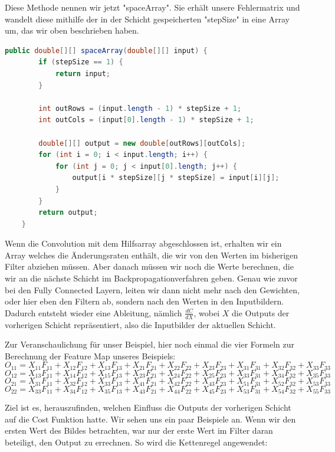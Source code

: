 \documentclass[12pt]{article}
\begin{document}
Diese Methode nennen wir jetzt "spaceArray". Sie erhält unsere Fehlermatrix und wandelt diese mithilfe der in der Schicht gespeicherten "stepSize" in eine Array um, das wir oben beschrieben haben.

\begin{lstlisting}[language=Java]
    public double[][] spaceArray(double[][] input) {
        if (stepSize == 1) {
            return input;
        }

        int outRows = (input.length - 1) * stepSize + 1;
        int outCols = (input[0].length - 1) * stepSize + 1;

        double[][] output = new double[outRows][outCols];
        for (int i = 0; i < input.length; i++) {
            for (int j = 0; j < input[0].length; j++) {
                output[i * stepSize][j * stepSize] = input[i][j];
            }
        }
        return output;
    }
\end{lstlisting}

Wenn die Convolution mit dem Hilfsarray abgeschlossen ist, erhalten wir ein Array welches die Änderungsraten enthält, die wir von den Werten im bisherigen Filter abziehen müssen.
Aber danach müssen wir noch die Werte berechnen, die wir an die nächste Schicht im Backpropagationverfahren geben. Genau wie zuvor bei den Fully Connected Layern, leiten wir dann nicht mehr nach den Gewichten, oder hier eben den Filtern ab, sondern nach den Werten in den Inputbildern. Dadurch entsteht wieder eine Ableitung, nämlich $\frac {dC} {dX}$, wobei $X$ die Outputs der vorherigen Schicht repräsentiert, also die Inputbilder der aktuellen Schicht.

Zur Veranschaulichung für unser Beispiel, hier noch einmal die vier Formeln zur Berechnung der Feature Map unseres Beispiels:
$$O_{11} = X_{11}F_{11}+X_{12}F_{12}+X_{13}F_{13}+X_{21}F_{21}+X_{22}F_{22}+X_{23}F_{23}+X_{31}F_{31}+X_{32}F_{32}+X_{33}F_{33}$$
$$O_{12} = X_{13}F_{11}+X_{14}F_{12}+X_{15}F_{13}+X_{23}F_{21}+X_{24}F_{22}+X_{25}F_{23}+X_{33}F_{31}+X_{34}F_{32}+X_{35}F_{33}$$
$$O_{21} = X_{31}F_{11}+X_{32}F_{12}+X_{33}F_{13}+X_{41}F_{21}+X_{42}F_{22}+X_{43}F_{23}+X_{51}F_{31}+X_{52}F_{32}+X_{53}F_{33}$$
$$O_{22} = X_{33}F_{11}+X_{34}F_{12}+X_{35}F_{13}+X_{43}F_{21}+X_{44}F_{22}+X_{45}F_{23}+X_{53}F_{31}+X_{54}F_{32}+X_{55}F_{33}$$

Ziel ist es, herauszufinden, welchen Einfluss die Outputs der vorherigen Schicht auf die Cost Funktion hatte.
Wir sehen uns ein paar Beispiele an. Wenn wir den ersten Wert des Bildes betrachten, war nur der erste Wert im Filter daran beteiligt, den Output zu errechnen. So wird die Kettenregel angewendet:
\end{document}
